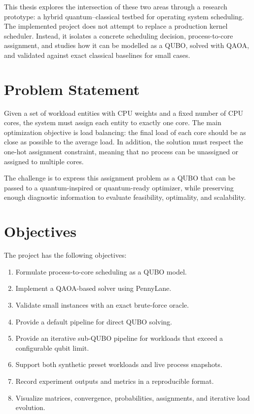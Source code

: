 \documentclass[12pt,a4paper,oneside]{report}
\begin{document}
This thesis explores the intersection of these two areas through a research
prototype: a hybrid quantum--classical testbed for operating system scheduling.
The implemented project does not attempt to replace a production kernel
scheduler. Instead, it isolates a concrete scheduling decision, process-to-core
assignment, and studies how it can be modelled as a QUBO, solved with QAOA, and
validated against exact classical baselines for small cases.

\section{Problem Statement}

Given a set of workload entities with CPU weights and a fixed number of CPU
cores, the system must assign each entity to exactly one core. The main
optimization objective is load balancing: the final load of each core should be
as close as possible to the average load. In addition, the solution must respect
the one-hot assignment constraint, meaning that no process can be unassigned or
assigned to multiple cores.

The challenge is to express this assignment problem as a QUBO that can be
passed to a quantum-inspired or quantum-ready optimizer, while preserving enough
diagnostic information to evaluate feasibility, optimality, and scalability.

\section{Objectives}

The project has the following objectives:

\begin{enumerate}
  \item Formulate process-to-core scheduling as a QUBO model.
  \item Implement a QAOA-based solver using PennyLane.
  \item Validate small instances with an exact brute-force oracle.
  \item Provide a default pipeline for direct QUBO solving.
  \item Provide an iterative sub-QUBO pipeline for workloads that exceed a
  configurable qubit limit.
  \item Support both synthetic preset workloads and live process snapshots.
  \item Record experiment outputs and metrics in a reproducible format.
  \item Visualize matrices, convergence, probabilities, assignments, and
  iterative load evolution.
\end{enumerate}
\end{document}
